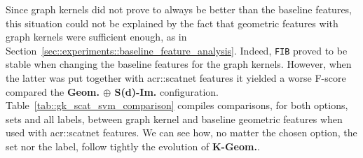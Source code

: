         Since graph kernels did not prove to always be better than the baseline features, this situation could not be explained by the fact that geometric features with graph kernels were sufficient enough, as in Section~\ref{sec::experiments::baseline_feature_analysis}.
        Indeed, \texttt{FIB} proved to be stable when changing the baseline features for the graph kernels.
        However, when the latter was put together with \gls{acr::scatnet} features it yielded a worse F-score compared the \textbf{Geom. \(\oplus\) S(d)-Im.} configuration.\\

        Table~\ref{tab::gk_scat_svm_comparison} compiles comparisons, for both options, sets and all labels, between graph kernel and baseline geometric features when used with \gls{acr::scatnet} features.
        We can see how, no matter the chosen option, the set nor the label, follow tightly the evolution of \textbf{K-Geom.}.\\

